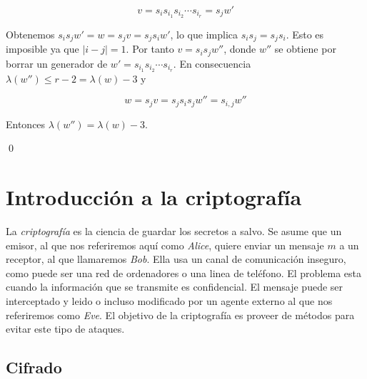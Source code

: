 \documentclass[12pt]{article}
\theoremstyle{definition}
\begin{document}
$$v=s_is_{i_1}s_{i_2}\cdots s_{i_r}=s_jw'$$

Obtenemos $s_is_jw'=w=s_jv=s_js_iw'$, lo que implica $s_is_j=s_js_i$. Esto es imposible ya que $|i-j|=1$. Por tanto $v=s_is_jw''$, donde $w''$ se obtiene por borrar un generador de $w'=s_{i_1}s_{i_2}\cdots s_{i_r}$. En consecuencia $\lambda(w'')\leq r-2=\lambda(w)-3$ y

$$w=s_jv=s_js_is_jw''=s_{i,j}w''$$

Entonces $\lambda(w'')=\lambda(w)-3$.

\qed


































\section{Introducción a la criptografía}

La \textit{criptografía} es la ciencia de guardar los secretos a salvo. Se asume que un emisor, al que nos referiremos aquí como \textit{Alice}, quiere enviar un mensaje $m$ a un receptor, al que llamaremos \textit{Bob}. Ella usa un canal de comunicación inseguro, como puede ser una red de ordenadores o una linea de teléfono. El problema esta cuando la información que se transmite es confidencial. El mensaje puede ser interceptado y leido o incluso modificado por un agente externo al que nos referiremos como \textit{Eve}. El objetivo de la criptografía es proveer de métodos para evitar este tipo de ataques.

\subsection{Cifrado}
\end{document}
